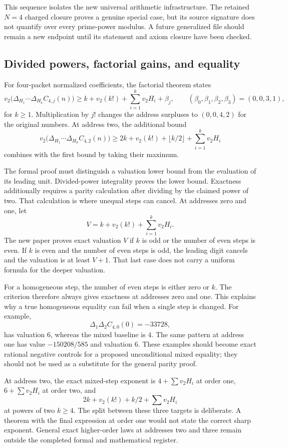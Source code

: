 This sequence isolates the new universal arithmetic infrastructure. The retained $N=4$ charged closure proves a genuine special case, but its source signature does not quantify over every prime-power modulus. A future generalized file should remain a new endpoint until its statement and axiom closure have been checked.

\subsection{Divided powers, factorial gains, and equality}
For four-packet normalized coefficients, the factorial theorem states
\[
 v_2\bigl(\Delta_{H_1}\cdots\Delta_{H_k}C_{4,j}(n)\bigr)
 \ge k+v_2(k!)+\sum_{i=1}^k v_2H_i+\beta_j,
 \qquad (\beta_0,\beta_1,\beta_2,\beta_3)=(0,0,3,1),
\]
for $k\ge1$. Multiplication by $j!$ changes the address surpluses to $(0,0,4,2)$ for the original numbers. At address two, the additional bound
\[
 v_2\bigl(\Delta_{H_1}\cdots\Delta_{H_k}C_{4,2}(n)\bigr)
 \ge2k+v_2(k!)+\lfloor k/2\rfloor+\sum_{i=1}^k v_2H_i
\]
combines with the first bound by taking their maximum.

The formal proof must distinguish a valuation lower bound from the evaluation of its leading unit. Divided-power integrality proves the lower bound. Exactness additionally requires a parity calculation after dividing by the claimed power of two. That calculation is where unequal steps can cancel. At addresses zero and one, let
\[
 V=k+v_2(k!)+\sum_{i=1}^k v_2H_i.
\]
The new paper proves exact valuation $V$ if $k$ is odd or the number of even steps is even. If $k$ is even and the number of even steps is odd, the leading digit cancels and the valuation is at least $V+1$. That last case does not carry a uniform formula for the deeper valuation.

For a homogeneous step, the number of even steps is either zero or $k$. The criterion therefore always gives exactness at addresses zero and one. This explains why a true homogeneous equality can fail when a single step is changed. For example,
\[
 \Delta_1\Delta_2 C_{4,0}(0)=-33728,
\]
has valuation $6$, whereas the mixed baseline is $4$. The same pattern at address one has value $-150208/585$ and valuation $6$. These examples should become exact rational negative controls for a proposed unconditional mixed equality; they should not be used as a substitute for the general parity proof.

At address two, the exact mixed-step exponent is $4+\sum v_2H_i$ at order one, $6+\sum v_2H_i$ at order two, and
\[
 2k+v_2(k!)+k/2+\sum v_2H_i
\]
at powers of two $k\ge4$. The split between these three targets is deliberate. A theorem with the final expression at order one would not state the correct sharp exponent. General exact higher-order laws at addresses two and three remain outside the completed formal and mathematical register.

